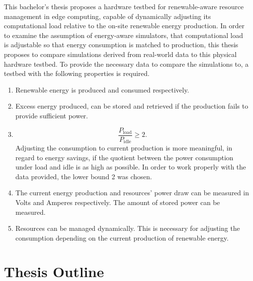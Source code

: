 This bachelor's thesis proposes a hardware testbed for renewable-aware resource
management in edge computing, capable of dynamically adjusting its computational
load relative to the on-site renewable energy production. In order to examine
the assumption of energy-aware simulators, that computational load is adjustable
so that energy consumption is matched to production, this thesis proposes to
compare simulations derived from real-world data to this physical hardware
testbed. To provide the necessary data to compare the simulations to, a testbed
with the following properties is required.

\begin{enumerate}
    \item Renewable energy is produced and consumed respectively.
    \item Excess energy produced, can be stored and retrieved if the production
        fails to provide sufficient power.
    \item \[ \frac{P_{\text{load}}}{P_{\text{idle}}} \geq 2 .\]
        Adjusting the consumption to current production is more meaningful, in
        regard to energy savings, if the quotient between the power consumption
        under load and idle is as high as possible. In order to work properly
        with the data provided, the lower bound 2 was chosen.
    \item The current energy production and resources' power draw can be
        measured in Volts and Amperes respectively. The amount of stored power
        can be measured.
    \item Resources can be managed dynamically. This is necessary for adjusting
        the consumption depending on the current production of renewable energy.
\end{enumerate}

\section{Thesis Outline}
